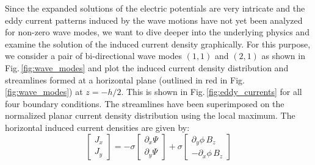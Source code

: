 \documentclass[aps,prfluids,reprint,superscriptaddress]{revtex4-2}
\begin{document}
Since the expanded solutions of the electric potentials are very intricate and the eddy current patterns induced by the wave motions have not yet been analyzed for non-zero wave modes, we want to dive deeper into the underlying physics and examine the solution of the induced current density graphically. For this purpose, we consider a pair of bi-directional wave modes $(1,1)$ and $(2,1)$ as shown in Fig.\,\ref{fig:wave_modes} and plot the induced current density distribution and streamlines formed at a horizontal plane (outlined in red in Fig.\,\ref{fig:wave_modes}) at $z=-h/2$. This is shown in Fig.\,\ref{fig:eddy_currents} for all four boundary conditions. The streamlines have been superimposed on the normalized planar current density distribution using the local maximum. The horizontal induced current densities are given by:
\begin{equation}
	\begin{bmatrix}
		J_x
		\\[5pt]
		J_y
	\end{bmatrix}
	=
	-\sigma
	\begin{bmatrix}
		\partial_x\Psi
		\\[5pt]
		\partial_y\Psi
	\end{bmatrix}
	+
	\sigma
	\begin{bmatrix}
		\partial_y\phi \,B_z
		\\[5pt]
		-\partial_x\phi\, B_z
	\end{bmatrix}
	\label{eq:eddy_current_vector}
\end{equation}  
\end{document}
